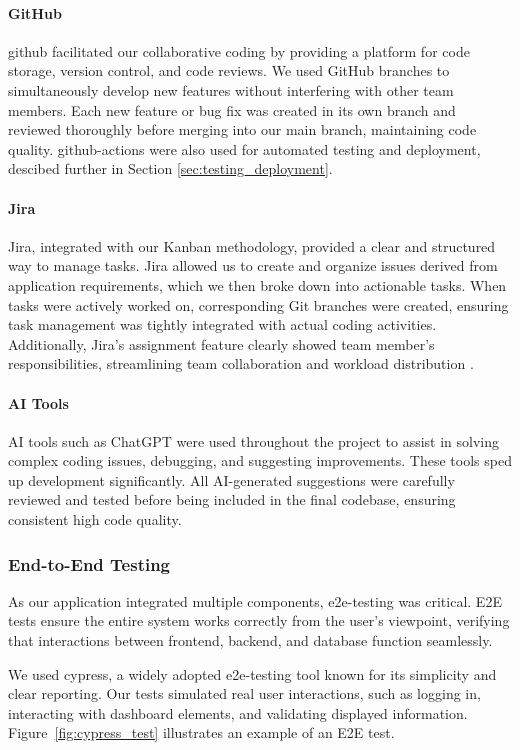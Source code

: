 \paragraph{GitHub}
\gls{github} facilitated our collaborative coding by providing a platform for code storage, version control, and code reviews. We used GitHub branches to simultaneously develop new features without interfering with other team members. Each new feature or bug fix was created in its own branch and reviewed thoroughly before merging into our main branch, maintaining code quality. \gls{github-actions} were also used for automated testing and deployment, descibed further in Section \ref{sec:testing_deployment}.

\paragraph{Jira} 
Jira, integrated with our Kanban methodology, provided a clear and structured way to manage tasks. Jira allowed us to create and organize issues derived from application requirements, which we then broke down into actionable tasks. When tasks were actively worked on, corresponding Git branches were created, ensuring task management was tightly integrated with actual coding activities. Additionally, Jira’s assignment feature clearly showed team member's responsibilities, streamlining team collaboration and workload distribution \autocite{Jira}.

\paragraph{AI Tools}
AI tools such as ChatGPT were used throughout the project to assist in solving complex coding issues, debugging, and suggesting improvements. These tools sped up development significantly. All AI-generated suggestions were carefully reviewed and tested before being included in the final codebase, ensuring consistent high code quality.

\subsubsection{End-to-End Testing}
As our application integrated multiple components, {\gls{e2e-testing}} was critical. E2E tests ensure the entire system works correctly from the user’s viewpoint, verifying that interactions between \gls{frontend}, \gls{backend}, and database function seamlessly.

We used {\gls{cypress}}, a widely adopted {\gls{e2e-testing}} tool known for its simplicity and clear reporting. Our tests simulated real user interactions, such as logging in, interacting with dashboard elements, and validating displayed information. Figure~\ref{fig:cypress_test} illustrates an example of an E2E test.

